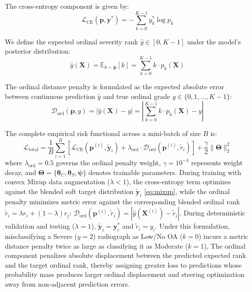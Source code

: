 \documentclass[10pt,journal]{IEEEtran}
\begin{document}
The cross-entropy component is given by:
\begin{equation}
\mathcal{L}_{\text{CE}}(\mathbf{p}, \mathbf{y}^*) = -\sum_{k=0}^{K-1} y_k^* \log p_k
\label{eq:ce_loss}
\end{equation}

We define the expected ordinal severity rank $\hat{y} \in [0, K-1]$ under the model's posterior distribution:
\begin{equation}
\hat{y}(\mathbf{X}) = \mathbb{E}_{k \sim \mathbf{p}}[k] = \sum_{k=0}^{K-1} k \cdot p_k(\mathbf{X})
\label{eq:expected_rank}
\end{equation}

The ordinal distance penalty is formulated as the expected absolute error between continuous prediction $\hat{y}$ and true ordinal grade $y \in \{0, 1, \dots, K-1\}$:
\begin{equation}
\mathcal{D}_{\text{ord}}(\mathbf{p}, y) = |\hat{y}(\mathbf{X}) - y| = \left| \sum_{k=0}^{K-1} k \cdot p_k(\mathbf{X}) - y \right|
\label{eq:mae_loss}
\end{equation}

The complete empirical risk functional across a mini-batch of size $B$ is:
\begin{equation}
\mathcal{L}_{\text{total}} = \frac{1}{B}\sum_{i=1}^B \left[ \mathcal{L}_{\text{CE}}(\mathbf{p}^{(i)}, \tilde{\mathbf{y}}_i) + \lambda_{\text{ord}} \cdot \mathcal{D}_{\text{ord}}(\mathbf{p}^{(i)}, \tilde{r}_i) \right] + \frac{\gamma}{2}\|\bm{\Theta}\|_2^2
\label{eq:total_loss}
\end{equation}
where $\lambda_{\text{ord}} = 0.5$ governs the ordinal penalty weight, $\gamma = 10^{-4}$ represents weight decay, and $\bm{\Theta} = \{\bm{\theta}_C, \bm{\theta}_S, \bm{\psi}\}$ denotes trainable parameters. During training with convex Mixup data augmentation ($\lambda < 1$), the cross-entropy term optimizes against the blended soft target distribution $\tilde{\mathbf{y}}_i$ \eqref{eq:mixup}, while the ordinal penalty minimizes metric error against the corresponding blended ordinal rank $\tilde{r}_i = \lambda r_i + (1 - \lambda)r_j$: $\mathcal{D}_{\text{ord}}(\mathbf{p}^{(i)}, \tilde{r}_i) = |\hat{y}(\mathbf{X}^{(i)}) - \tilde{r}_i|$. During deterministic validation and testing ($\lambda = 1$), $\tilde{\mathbf{y}}_i = \mathbf{y}_i^*$ and $\tilde{r}_i = y_i$. Under this formulation, misclassifying a Severe ($y=2$) radiograph as Low/No OA ($k=0$) incurs a metric distance penalty twice as large as classifying it as Moderate ($k=1$), The ordinal component penalizes absolute displacement between the predicted expected rank and the target ordinal rank, thereby assigning greater loss to predictions whose probability mass produces larger ordinal displacement and steering optimization away from non-adjacent prediction errors.
\end{document}
